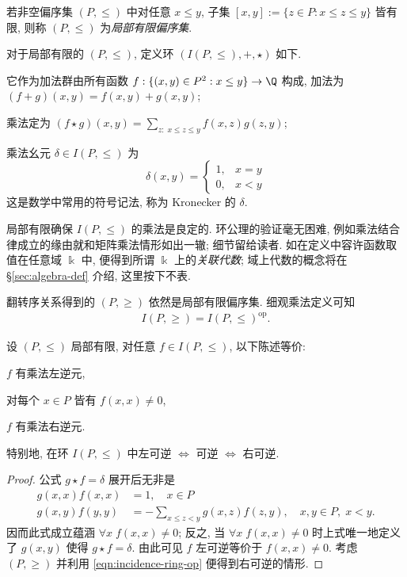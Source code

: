 \begin{definition}
	若非空偏序集 $(P, \leq)$ 中对任意 $x \leq y$, 子集 $[x,y] := \{ z \in P: x \leq z \leq y \}$ 皆有限, 则称 $(P,\leq)$ 为\emph{局部有限偏序集}.
\end{definition}

对于局部有限的 $(P, \leq)$, 定义环 $(I(P, \leq),+,\star)$ 如下.
\begin{compactitem}
	\item 它作为加法群由所有函数 $f: \{(x,y) \in P^2 : x \leq y \} \to \Q$ 构成, 加法为 \linebreak $(f+g)(x,y) = f(x,y) + g(x,y)$;
	\item 乘法定为 $(f \star g)(x,y) = \sum_{z: \; x \leq z \leq y} f(x,z) g(z,y)$;
	\item 乘法幺元 $\delta \in I(P, \leq)$ 为
	\[ \delta(x,y) = \begin{cases} 1, & x=y \\ 0, & x < y \end{cases} \]
	这是数学中常用的符号记法, 称为 Kronecker 的 $\delta$. 
\end{compactitem}
局部有限确保 $I(P, \leq)$ 的乘法是良定的. 环公理的验证毫无困难, 例如乘法结合律成立的缘由就和矩阵乘法情形如出一辙; 细节留给读者. 如在定义中容许函数取值在任意域 $\Bbbk$ 中, 便得到所谓 $\Bbbk$ 上的\emph{关联代数}; 域上代数的概念将在 \S\ref{sec:algebra-def} 介绍, 这里按下不表.

翻转序关系得到的 $(P, \geq)$ 依然是局部有限偏序集. 细观乘法定义可知
\begin{gather}\label{eqn:incidence-ring-op}
	I(P,\geq) = I(P, \leq)^\text{op}.
\end{gather}

\begin{lemma}\label{prop:incidence-ring-inv}
	设 $(P, \leq)$ 局部有限, 对任意 $f \in I(P, \leq)$, 以下陈述等价:
	\begin{compactitem}
		\item $f$ 有乘法左逆元,
		\item 对每个 $x \in P$ 皆有 $f(x,x) \neq 0$,
		\item $f$ 有乘法右逆元.
	\end{compactitem}
	特别地, 在环 $I(P, \leq)$ 中左可逆 $\iff$ 可逆 $\iff$ 右可逆.
\end{lemma}
\begin{proof}
	公式 $g \star f = \delta$ 展开后无非是
	\begin{align*}
		g(x,x)f(x,x) & =1, \quad x \in P \\
		g(x,y) f(y,y) & = - \sum_{x \leq z < y} g(x,z) f(z,y), \quad x,y \in P, \; x < y.
	\end{align*}
	因而此式成立蕴涵 $\forall x \; f(x,x) \neq 0$; 反之, 当 $\forall x \; f(x,x) \neq 0$ 时上式唯一地定义了 $g(x,y)$ 使得 $g \star f = \delta$. 由此可见 $f$ 左可逆等价于 $f(x,x) \neq 0$. 考虑 $(P,\geq)$ 并利用 \eqref{eqn:incidence-ring-op} 便得到右可逆的情形.
\end{proof}


